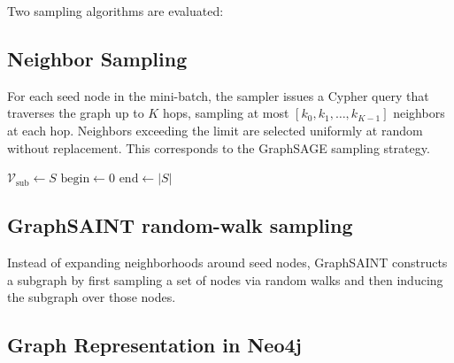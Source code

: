 \documentclass[ oneside,openright,titlepage,numbers=noenddot,headinclude,%
                footinclude=true,cleardoublepage=empty,abstractoff, %
                BCOR=0mm,paper=a4,fontsize=11pt,%
                ngerman,american,%
                ]{scrreprt}
\begin{document}
Two sampling algorithms are evaluated:

\subsection{Neighbor Sampling}
For each seed node in the mini-batch, the sampler
issues a Cypher query that traverses the graph up to $K$ hops, sampling at most
$[k_0, k_1, \ldots, k_{K-1}]$ neighbors at each hop. Neighbors exceeding the limit
are selected uniformly at random without replacement. This corresponds to the GraphSAGE
sampling strategy.
\begin{algorithm}[H]
\footnotesize
\caption{Neighbor Sampling}
\label{algo:neighbor_sampling}
\DontPrintSemicolon
{}

$\mathcal{V}_{\mathrm{sub}} \leftarrow S$\;
$\mathrm{begin} \leftarrow 0$\;
$\mathrm{end} \leftarrow |S|$\;

\;
\end{algorithm}

\subsection{GraphSAINT random-walk sampling}
Instead of expanding neighborhoods
around seed nodes, GraphSAINT constructs a subgraph by first sampling a set of nodes
via random walks and then inducing the subgraph over those nodes.


\subsection{Graph Representation in Neo4j}\label{sec:graph_repr}
\end{document}
